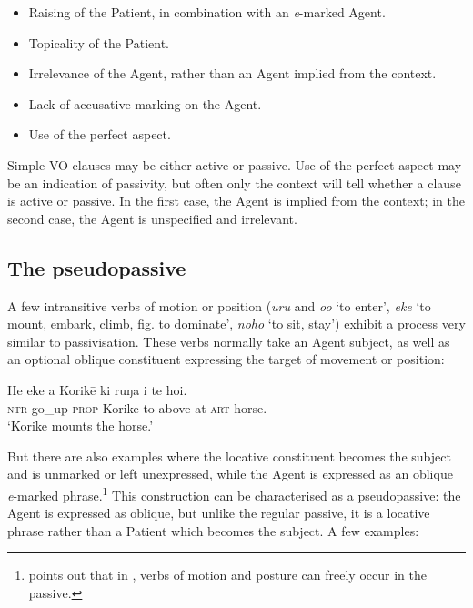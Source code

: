 \begin{itemize}
\item 
Raising of the Patient, in combination with an \textit{e}{}-marked Agent.

\item 
Topicality of the Patient.

\item 
Irrelevance of the Agent, rather than an Agent implied from the context.

\item 
Lack of accusative marking on the Agent.

\item 
Use of the perfect aspect. 

\end{itemize}

Simple VO clauses may be either active or passive. Use of the perfect aspect may be an indication of passivity, but often only the context will tell whether a clause is active or passive. In the first case, the Agent is implied from the context; in the second case, the Agent is unspecified and irrelevant.

\subsection{The pseudopassive}\label{sec:8.5.2}
A few intransitive verbs of motion or position (\textit{uru} and \textit{o{\ꞌ}o} ‘to enter’, \textit{eke} ‘to mount, embark, climb, fig. to dominate’, \textit{noho} ‘to sit, stay’) exhibit a process very similar to passivisation. These verbs normally take an Agent subject, as well as an optional oblique constituent expressing the target of movement or position:

\ea\label{ex:8.59}
\gll He eke a Korikē ki ruŋa i te hoi.\\
\textsc{ntr} go\_up \textsc{prop} Korike to above at \textsc{art} horse.\\

\glt
‘Korike mounts the horse.’ \textstyleExampleref{[R616.059]} 
\z

But there are also examples where the locative constituent becomes the subject and is unmarked or left unexpressed, while the Agent is expressed as an oblique \textit{e}{}-marked phrase.\footnote{\label{fn:416}\citet[40]{Hooper1984Neuter} points out that in , verbs of motion and posture can freely occur in the passive.} This construction can be characterised as a pseudopassive: the Agent is expressed as oblique, but unlike the regular passive, it is a locative phrase rather than a Patient which becomes the subject. A few examples:


